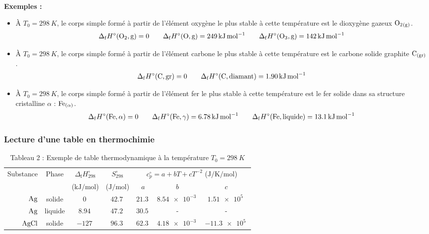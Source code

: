 \documentclass{article}
\newcommand{\Df}{\Delta_{\mathrm{f}}}
\renewcommand{\arraystretch}{1.5} %
\begin{document}
\textbf{Exemples :}
\begin{itemize}
    \item À $T_0 = \SI{298}{K}$, le corps simple formé à partir  de l'élément oxygène le plus stable à cette température est le dioxygène gazeux $\ce{O2_{(g)}}$.
    $$\Df H^\circ(\ce{O2,g}) = 0\qquad \Df H^\circ(\ce{O,g}) = \SI{+249}{\kilo\joule\per\mole}\qquad \Df H^\circ(\ce{O3,g}) = \SI{+142}{\kilo\joule\per\mole}$$
    \item À $T_0 = \SI{298}{K}$, le corps simple formé à partir  de l'élément carbone le plus stable à cette température est le carbone solide graphite $\ce{C_{(gr)}}$.
    $$\Df H^\circ(\ce{C,gr}) = 0\qquad \Df H^\circ(\ce{C,diamant}) = \SI{+1,90}{\kilo\joule\per\mole}$$
    \item À $T_0 = \SI{298}{K}$, le corps simple formé à partir  de l'élément fer le plus stable à cette température est le fer solide dans sa structure cristalline $\alpha$ : $\ce{Fe_{(\alpha)}}$.
    $$\Df H^\circ(\ce{Fe,\alpha}) = 0\qquad \Df H^\circ(\ce{Fe,\gamma}) = \SI{+6,78}{\kilo\joule\per\mole}\qquad \Df H^\circ(\ce{Fe,liquide}) = \SI{+13,1}{\kilo\joule\per\mole}$$
\end{itemize}


\subsubsection{Lecture d'une table en thermochimie}
\begin{table}[H]
\centering
\def\arraystretch{1.5}
\begin{tabular}{|r|c|c|c|c|c|c|} 
\hline
\multirow{2}{*}{Substance} & \multirow{2}{*}{Phase} & $\Df H^\circ_{298}$          & $S^\circ_{298}$         & \multicolumn{3}{c|}{$c_p^\circ = a +bT + cT^{-2}$ ($\si{\joule\per\kelvin\per\mole}$)}  \\ 
\cline{3-7}
                           &                        & ($\si{\kilo\joule\per\mole}$) & ($\si{\joule\per\mole}$) & $a$           & $b$              & $c$                                                   \\ 
\hline
$\ce{Ag}$                  & solide                 & $\SI{0}{}$                    & $\SI{42,7}{}$            & $\SI{21,3}{}$ & $\SI{8,54e-3}{}$ & $\SI{1,51e5}{}$                                       \\ 
\hline
$\ce{Ag}$                  & liquide                & $\SI{8,94}{}$                 & $\SI{47,2}{}$            & $\SI{30,5}{}$ & -                & -                                                     \\ 
\hline
$\ce{AgCl}$                & solide                 & $\SI{-127}{}$                 & $\SI{96,3}{}$            & $\SI{62,3}{}$ & $\SI{4,18e-3}{}$ & $\SI{-11,3e5}{}$                                      \\
\hline
\end{tabular}
\caption*{Tableau 2 : Exemple de table thermodynamique à la température $T_0 = \SI{298}{K}$ }
\end{table}
\end{document}
